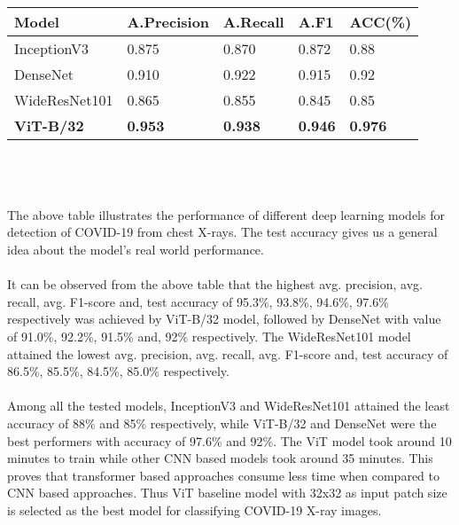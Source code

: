 \documentclass[conference]{IEEEtran}
\begin{document}
   \noindent \begin{tabular}{|p{21mm}|p{15mm}|p{12mm}|p{10mm}|p{11mm}|}
    
    \hline
    Model & A.Precision & A.Recall & A.F1 & ACC(\%)\\
    \hline
    InceptionV3    & 0.875 & 0.870 & 0.872 & 0.88\\
    DenseNet       & 0.910 & 0.922 & 0.915 & 0.92\\
    WideResNet101  & 0.865 & 0.855 & 0.845 & 0.85\\
    \textbf{ViT-B/32}   & \textbf{0.953} & \textbf{0.938} & \textbf{0.946} & \textbf{0.976}\\
    \hline
    \end{tabular}\\\\\\
    The above table illustrates the performance of different deep learning models for detection of COVID-19 from chest X-rays. The test accuracy gives us a general idea about the model's real world performance.\\\\
    It can be observed from the above table that the highest avg. precision, avg. recall, avg. F1-score and, test accuracy of 95.3\%, 93.8\%, 94.6\%, 97.6\% respectively was achieved by ViT-B/32\cite{dosovitskiy2021image} model, followed by DenseNet\cite{huang2018densely} with value of 91.0\%, 92.2\%, 91.5\% and, 92\% respectively. The WideResNet101\cite{DBLP:journals/corr/ZagoruykoK16} model attained the lowest avg. precision, avg. recall, avg. F1-score and, test accuracy of 86.5\%, 85.5\%, 84.5\%, 85.0\% respectively.\\\\
    Among all the tested models, InceptionV3\cite{szegedy2015rethinking} and WideResNet101\cite{DBLP:journals/corr/ZagoruykoK16} attained the least accuracy of 88\% and 85\% respectively, while ViT-B/32\cite{dosovitskiy2021image} and DenseNet\cite{huang2018densely} were the best performers with accuracy of 97.6\% and 92\%. The ViT\cite{dosovitskiy2021image} model took around 10 minutes to train while other CNN based models took around 35 minutes. This proves that transformer based approaches consume less time when compared to CNN based approaches.
    Thus ViT\cite{dosovitskiy2021image} baseline model with 32x32 as input patch size is selected as the best model for classifying COVID-19 X-ray images.
\end{document}
